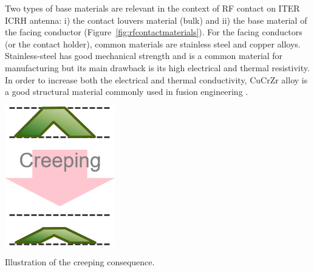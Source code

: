 {Two types of base materials are relevant in the context of RF contact on ITER ICRH antenna: i) the contact louvers material (bulk) and ii) the base material of the facing conductor (Figure~\ref{fig:rfcontactmaterials}). For the facing conductors (or the contact holder), common materials are stainless steel and copper alloys. Stainless-steel has good mechanical strength and is a common material for manufacturing but its main drawback is its high electrical and thermal resistivity. In order to increase both the electrical and thermal conductivity, CuCrZr alloy is a good structural material commonly used in fusion engineering  . 

\begin{marginfigure}
	\centering
	\includegraphics[width=0.5\linewidth]{figures/chap3/RF_contacts/RF_contact_creeping}
	\caption{Illustration of the creeping consequence.}
	\label{fig:rfcontactcreeping}
\end{marginfigure}

}

